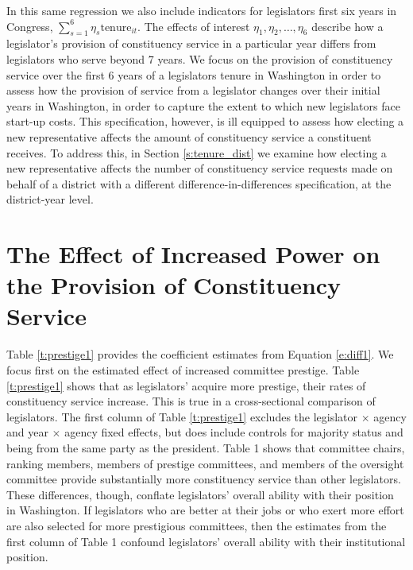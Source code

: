 \documentclass{article}
\begin{document}
In this same regression we also include indicators for legislators first six years in Congress,  $ \sum_{s = 1}^{6} \eta_{s} \text{tenure}_{it}$.  The effects of interest $\eta_{1}, \eta_{2}, \hdots, \eta_{6}$ describe how a legislator's provision of constituency service in a particular year differs from legislators who serve beyond 7 years.  We focus on the provision of constituency service over the first 6 years of a legislators tenure in Washington in order to assess how the provision of service from a legislator changes over their initial years in Washington, in order to capture the extent to which new legislators face start-up costs. This specification, however, is ill equipped to assess how electing a new representative affects the amount of constituency service a constituent receives.  To address this, in Section \ref{s:tenure_dist} we examine how electing a new representative affects the number of constituency service requests made on behalf of a district with a different difference-in-differences specification, at the district-year level.    

\section{The Effect of Increased Power on the Provision of Constituency Service}
Table \ref{t:prestige1} provides the coefficient estimates from Equation \ref{e:diff1}. We focus first on the estimated effect of increased committee prestige.  Table \ref{t:prestige1} shows that as legislators' acquire more prestige, their rates of constituency service increase. This is true in a cross-sectional comparison of legislators.  The first column of Table \ref{t:prestige1} excludes the legislator $\times$ agency  and year $\times$ agency fixed effects, but does include controls for majority status and being from the same party as the president.  Table 1 shows that committee chairs, ranking members, members of prestige committees, and members of the oversight committee provide substantially more constituency service than other legislators.  These differences, though, conflate legislators' overall ability with their position in Washington.  If legislators who are better at their jobs or who exert more effort are also selected for more prestigious committees, then the estimates from the first column of Table 1 confound legislators' overall ability with their institutional position.    


\begin{table}[hbt!]
\caption{Estimating the Effect of Increased Prestige and Tenure on Constituency Service Provision} \label{t:prestige1}

\begin{minipage}{\textwidth}
\begin{center}

\end{center}
\end{minipage}
\end{table}
\end{document}
